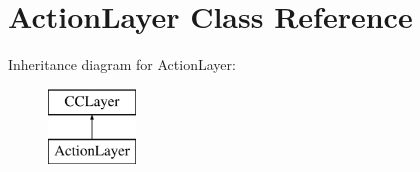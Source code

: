 \hypertarget{interface_action_layer}{\section{Action\-Layer Class Reference}
\label{interface_action_layer}
}
Inheritance diagram for Action\-Layer\-:\begin{figure}[H]
\begin{center}
\leavevmode
\includegraphics[height=2.000000cm]{interface_action_layer}
\end{center}
\end{figure}
